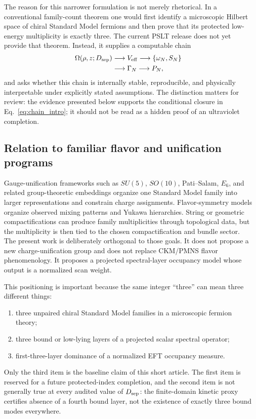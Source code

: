 \documentclass[pdflatex,sn-mathphys-num,iicol]{sn-jnl}
\newcommand{\Dsep}{D_{\rm sep}}
\begin{document}
The reason for this narrower formulation is not merely rhetorical.
In a conventional family-count theorem one would first identify a microscopic Hilbert space of chiral Standard Model fermions and then prove that its protected low-energy multiplicity is exactly three.
The current PSLT release does not yet provide that theorem.
Instead, it supplies a computable chain
\begin{equation}
    \begin{aligned}
    \Omega(\rho,z;\Dsep)
    &\longrightarrow V_{\rm eff}
    \longrightarrow \{\omega_N,S_N\} \\
    &\longrightarrow \Gamma_N
    \longrightarrow P_N ,
    \end{aligned}
    \label{eq:chain_intro}
\end{equation}
and asks whether this chain is internally stable, reproducible, and physically interpretable under explicitly stated assumptions.
The distinction matters for review: the evidence presented below supports the conditional closure in Eq.~\eqref{eq:chain_intro}; it should not be read as a hidden proof of an ultraviolet completion.

\subsection{Relation to familiar flavor and unification programs}

Gauge-unification frameworks such as \(SU(5)\), \(SO(10)\), Pati--Salam, \(E_6\), and related group-theoretic embeddings organize one Standard Model family into larger representations and constrain charge assignments.
Flavor-symmetry models organize observed mixing patterns and Yukawa hierarchies.
String or geometric compactifications can produce family multiplicities through topological data, but the multiplicity is then tied to the chosen compactification and bundle sector.
The present work is deliberately orthogonal to those goals.
It does not propose a new charge-unification group and does not replace CKM/PMNS flavor phenomenology.
It proposes a projected spectral-layer occupancy model whose output is a normalized scan weight.

This positioning is important because the same integer ``three'' can mean three different things:
\begin{enumerate}
    \item three unpaired chiral Standard Model families in a microscopic fermion theory;
    \item three bound or low-lying layers of a projected scalar spectral operator;
    \item first-three-layer dominance of a normalized EFT occupancy measure.
\end{enumerate}
Only the third item is the baseline claim of this short article.
The first item is reserved for a future protected-index completion, and the second item is not generally true at every audited value of \(\Dsep\): the finite-domain kinetic proxy certifies absence of a fourth bound layer, not the existence of exactly three bound modes everywhere.
\end{document}
